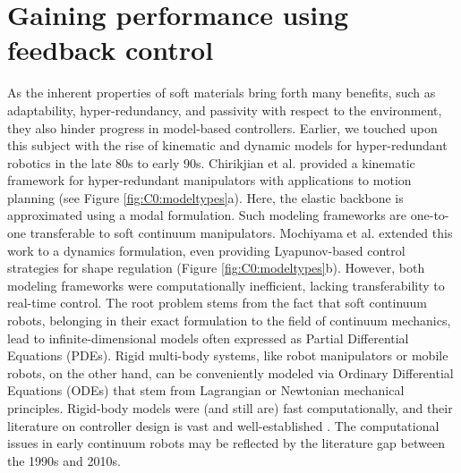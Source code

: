 \section{Gaining performance using feedback control}
\label{sec:C0:modelcontrol}
As the inherent properties of soft materials bring forth many benefits, such as adaptability, hyper-redundancy, and passivity with respect to the environment, they also hinder progress in model-based controllers. Earlier, we touched upon this subject with the rise of kinematic and dynamic models for hyper-redundant robotics in the late 80s to early 90s. Chirikjian et al. \cite{Chirikjian1992} provided a kinematic framework for hyper-redundant manipulators with applications to motion planning (see Figure \ref{fig:C0:modeltypes}a). Here, the elastic backbone is approximated using a modal formulation. Such modeling frameworks are one-to-one transferable to soft continuum manipulators. Mochiyama et al. \cite{Mochiyama1998,Mochiyama2003} extended this work to a dynamics formulation, even providing Lyapunov-based control strategies for shape regulation (Figure \ref{fig:C0:modeltypes}b). However, both modeling frameworks were computationally inefficient, lacking transferability to real-time control. The root problem stems from the fact that soft continuum robots, belonging in their exact formulation to the field of continuum mechanics, lead to infinite-dimensional models often expressed as Partial Differential Equations (PDEs). Rigid multi-body systems, like robot manipulators or mobile robots, on the other hand, can be conveniently modeled via Ordinary Differential Equations (ODEs) that stem from Lagrangian or Newtonian mechanical principles. Rigid-body models were (and still are) fast computationally, and their literature on controller design is vast and well-established \cite{Murray1994,Corke2011,Spong2006}. The computational issues in early continuum robots may be reflected by the literature gap between the 1990s and 2010s. 
\vspace{-3mm}
